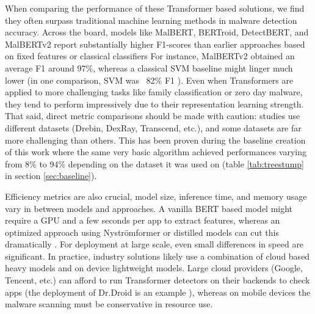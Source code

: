 When comparing the performance of these Transformer based solutions, 
we find they often surpass traditional machine learning methods in malware detection accuracy. 
Across the board, models like MalBERT, BERTroid, DetectBERT, and MalBERTv2 report substantially higher 
F1-scores than earlier approaches based on fixed features or classical classifiers
\cite{bertroid}
For instance, MalBERTv2 obtained an average F1 around 97\%, whereas a classical 
SVM baseline might linger much lower (in one comparison, SVM was ~82\% F1 \cite{malbert_two}). 
Even when Transformers are applied to more challenging tasks like family classification 
or zero day malware, they tend to perform impressively due to their representation learning strength. 
That said, direct metric comparisons should be made with caution: 
studies use different datasets (Drebin, DexRay, Transcend, etc.), and some datasets 
are far more challenging than others. This has been proven during the baseline creation of this work where
the same very basic algorithm achieved performances varying from 8\% to 94\% depending on the dataset it was used on
(table \ref{tab:treestump} in section \ref{sec:baseline}). 

Efficiency metrics are also crucial, model size, 
inference time, and memory usage vary in between models and approaches. 
A vanilla BERT based model might require a 
GPU and a few seconds per app to extract features, whereas an optimized approach using Nyströmformer 
\cite{nystromformer} 
or distilled models can cut this dramatically 
\cite{detectbert}. 
For deployment at large scale, 
even small differences in speed are significant. 
In practice, industry solutions likely use a combination of cloud based heavy models 
and on device lightweight models. 
Large cloud providers (Google, Tencent, etc.) can afford to run Transformer detectors on their 
backends to check apps (the deployment of Dr.Droid is an example
\cite{htgt}
), whereas on mobile devices the malware scanning must be conservative in resource use. 

